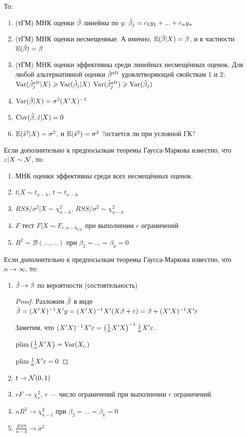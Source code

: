 \documentclass[12pt, a4paper]{article}\usepackage[]{graphicx}\usepackage[]{color}
\begin{document}
То:

\begin{enumerate}
\item (тГМ) МНК оценки $\hat{\beta}$ линейны по $y$:
$\hat{\beta}_j=c_1 y_1 + ... + c_n y_n$
\item  (тГМ) МНК оценки несмещенные. А именно, $\mathbb{E}(\hat{\beta} |X )=\beta$, и в частности $\mathbb{E}(\hat{\beta})=\beta$
\item  (тГМ) МНК оценки эффективны среди линейных несмещённых оценок. Для любой альтернативной оценки $\hat{\beta}^{alt}$ удовлетворяющей свойствам 1 и 2:
$\operatorname{Var}(\hat{\beta}_j^{alt} | X)\geqslant \operatorname{Var}(\hat{\beta}_j | X)$
$\operatorname{Var}(\hat{\beta}_j^{alt} )\geqslant \operatorname{Var}(\hat{\beta}_j )$
\item  $\operatorname{Var}(\hat{\beta} | X )=\sigma^2 (X'X)^{-1}$
\item $\operatorname{Cov}(\hat{\beta},\hat{\varepsilon} | X)=0$
\item  $\mathbb{E}(\hat{s}^2 |X ) = \sigma^2$, и $\mathbb{E}(\hat{s}^2 ) = \sigma^2$ ?остается ли при условной ГК?
\end{enumerate}

Если дополнительно к предпосылкам теоремы Гаусса-Маркова известно, что $\varepsilon |X \sim \mathcal{N}$, то:

\begin{enumerate}
\item МНК оценки эффективны среди всех несмещённых оценок.
\item $t|X \sim t_{n-k}$, $t\sim t_{n-k}$
\item $RSS/\sigma^2 |X \sim \chi^2_{n-k}$, $RSS/\sigma^2 \sim \chi^2_{n-k}$
\item $F$ тест $F|X \sim F_{r, n-k_{UR}}$  при выполнении $r$ ограничений
\item $R^2 \sim \mathcal{B}(..., ...)$ при $\beta_2 = \ldots = \beta_k = 0$
\end{enumerate}

Если дополнительно к предпосылкам теоремы Гаусса-Маркова известно, что $n\to \infty$, то:

\begin{enumerate}
\item  $\hat{\beta} \to \beta$ по вероятности (состоятельность)

\begin{proof}
Разложим $\hat{\beta}$ в виде $\hat{\beta}=(X'X)^{-1}X'y=(X'X)^{-1}X'(X\beta+\varepsilon)=\beta+(X'X)^{-1}X'\varepsilon$

Заметим, что $(X'X)^{-1}X'\varepsilon=\left(\frac{1}{n}X'X\right)^{-1}\frac{1}{n}X'\varepsilon$.

$\operatorname*{plim} \left(\frac{1}{n}X'X\right)=\operatorname{Var}(X_{i.})$

$\operatorname*{plim} \frac{1}{n}X'\varepsilon=0$
\end{proof}

\item $t \to \mathcal{N}(0,1)$
\item $rF \to \chi^2_r$, $r$ — число ограничений при выполнении $r$ ограничений
\item $nR^2 \to \chi^2_{k-1}$ при $\beta_2 = \ldots = \beta_k = 0$
\item $\frac{RSS}{n-k} \to \sigma^2 $
\end{enumerate}
\end{document}
